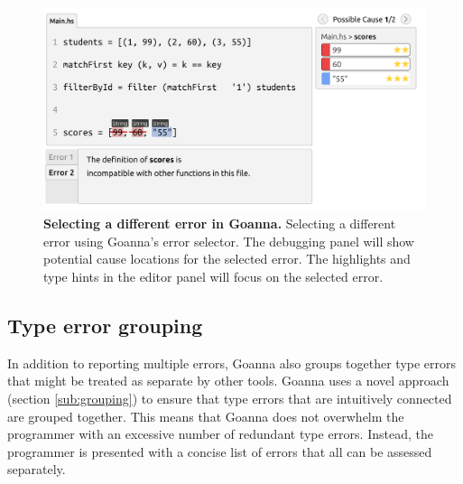    \begin{figure}[ht!]
        \centering
        \includegraphics[width=\linewidth]{images/goanna-multi-error}
        \caption[Selecting a different error in Goanna]{\textbf{Selecting a different error in Goanna.} Selecting a different error using Goanna's error selector. The debugging panel will show potential cause locations for the selected error. The highlights and type hints in the editor panel will focus on the selected error.}
        \label{fig:multi-error}
    \end{figure}



    \subsection{Type error grouping}  \label{sub:group}
    In addition to reporting multiple errors, Goanna also groups together type errors that might be treated as separate by other tools. Goanna uses a novel approach (section \ref{sub:grouping}) to ensure that type errors that are intuitively connected are grouped together. This means that Goanna does not overwhelm the programmer with an excessive number of redundant type errors. Instead, the programmer is presented with a concise list of errors that all can be assessed separately.

